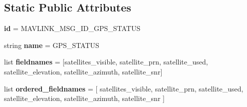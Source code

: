\subsection*{Static Public Attributes}
\begin{DoxyCompactItemize}
\item 
\mbox{\label{classpymavlink_1_1dialects_1_1v10_1_1MAVLink__gps__status__message_a2c3773cf4f40bd31ddc63de3cc2fecdd}} 
{\bfseries id} = M\+A\+V\+L\+I\+N\+K\+\_\+\+M\+S\+G\+\_\+\+I\+D\+\_\+\+G\+P\+S\+\_\+\+S\+T\+A\+T\+US
\item 
\mbox{\label{classpymavlink_1_1dialects_1_1v10_1_1MAVLink__gps__status__message_a98f4cca0ea5b579c19f56ea3733107fd}} 
string {\bfseries name} = \textquotesingle{}G\+P\+S\+\_\+\+S\+T\+A\+T\+US\textquotesingle{}
\item 
\mbox{\label{classpymavlink_1_1dialects_1_1v10_1_1MAVLink__gps__status__message_a31e26c80350a01872a9d5cac9a67c56b}} 
list {\bfseries fieldnames} = \mbox{[}\textquotesingle{}satellites\+\_\+visible\textquotesingle{}, \textquotesingle{}satellite\+\_\+prn\textquotesingle{}, \textquotesingle{}satellite\+\_\+used\textquotesingle{}, \textquotesingle{}satellite\+\_\+elevation\textquotesingle{}, \textquotesingle{}satellite\+\_\+azimuth\textquotesingle{}, \textquotesingle{}satellite\+\_\+snr\textquotesingle{}\mbox{]}
\item 
\mbox{\label{classpymavlink_1_1dialects_1_1v10_1_1MAVLink__gps__status__message_a9e8e9f12bc2b1275112d1cde124f7f49}} 
list {\bfseries ordered\+\_\+fieldnames} = \mbox{[} \textquotesingle{}satellites\+\_\+visible\textquotesingle{}, \textquotesingle{}satellite\+\_\+prn\textquotesingle{}, \textquotesingle{}satellite\+\_\+used\textquotesingle{}, \textquotesingle{}satellite\+\_\+elevation\textquotesingle{}, \textquotesingle{}satellite\+\_\+azimuth\textquotesingle{}, \textquotesingle{}satellite\+\_\+snr\textquotesingle{} \mbox{]}
\item 
\mbox{\label{classpymavlink_1_1dialects_1_1v10_1_1MAVLink__gps__status__message_a05580de4af4dd5d7f6a68fadecc4838e}} 

\end{DoxyCompactItemize}
